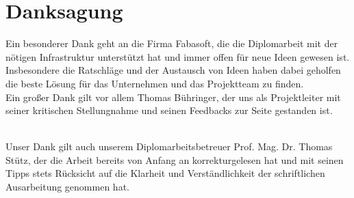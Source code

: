 \setcounter{page}{\value{abstractpage}}

\section*{Danksagung}
Ein besonderer Dank geht an die Firma Fabasoft, die die Diplomarbeit mit der nötigen Infrastruktur unterstützt hat und immer offen für neue Ideen gewesen ist. Insbesondere die Ratschläge und der Austausch von Ideen haben dabei geholfen die beste Lösung für das Unternehmen und das Projektteam zu finden.\\
Ein großer Dank gilt vor allem Thomas Bühringer, der uns als Projektleiter mit seiner kritischen Stellungnahme und seinen Feedbacks zur Seite gestanden ist. 

\mbox{}\\
Unser Dank gilt auch unserem Diplomarbeitsbetreuer Prof. Mag. Dr. Thomas Stütz, der die Arbeit bereits von Anfang an korrekturgelesen hat und mit seinen Tipps stets Rücksicht auf die Klarheit und Verständlichkeit der schriftlichen Ausarbeitung genommen hat.


